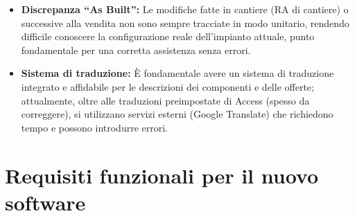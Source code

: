 \begin{itemize}
            nuova versione o se è obsoleto, rischiando di vendere pezzi non più procurabili. Serve un sistema di tracciamento delle
            sostituzioni e delle obsolescenze (es. Fusion).
      \item \textbf{Discrepanza ``As Built'':} Le modifiche fatte in cantiere (\ac{RA} di cantiere) o successive alla vendita non
            sono sempre tracciate in modo unitario, rendendo difficile conoscere la configurazione reale dell'impianto attuale, punto
            fondamentale per una corretta assistenza senza errori.
      \item \textbf{Sistema di traduzione:} È fondamentale avere un sistema di traduzione
            integrato e affidabile per le descrizioni
            dei componenti e delle offerte; attualmente, oltre alle traduzioni preimpostate di Access
            (spesso da correggere), si utilizzano
            servizi esterni (Google Translate) che richiedono tempo e possono introdurre errori.
\end{itemize}

\section{Requisiti funzionali per il nuovo software}

